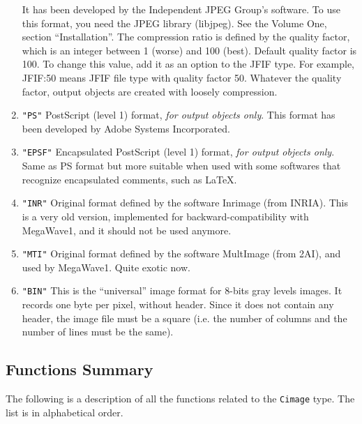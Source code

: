 \begin{enumerate}
It has been developed by the Independent JPEG Group's software.
To use this format, you need the JPEG library (libjpeg). See the Volume One, section 
``Installation''. 
The compression ratio is defined by the quality factor, which is an integer between 1 (worse) and 100 (best).
Default quality factor is 100. To change this value, add it as an option to the JFIF type.
For example, JFIF:50 means JFIF file type with quality factor 50.
Whatever the quality factor, output objects are created with loosely compression.
\item \verb+"PS"+ PostScript (level 1) format, {\em for output objects only}.
This format has been developed by Adobe Systems Incorporated.
\item \verb+"EPSF"+ Encapsulated PostScript (level 1) format, {\em for output objects only}.
Same as PS format but more suitable when used with some softwares that recognize encapsulated comments, such as \LaTeX.
\item \verb+"INR"+ Original format defined by the software Inrimage (from INRIA). This is a very old version, implemented for
backward-compatibility with MegaWave1, and it should not be used anymore.
\item \verb+"MTI"+ Original format defined by the software MultImage (from 2AI), and used by MegaWave1. Quite exotic now.
\item \verb+"BIN"+ This is the ``universal'' image format for 8-bits gray levels images.
It records one byte per pixel, without header.
Since it does not contain any header, the image file must be a square (i.e. the number of columns and the number of lines must be the same).
\end{enumerate}

\subsection{Functions Summary}
\label{images_char-images_function}

The following is a description of all the functions related to 
the \verb+Cimage+ type. The list is in alphabetical order.

\newpage %



